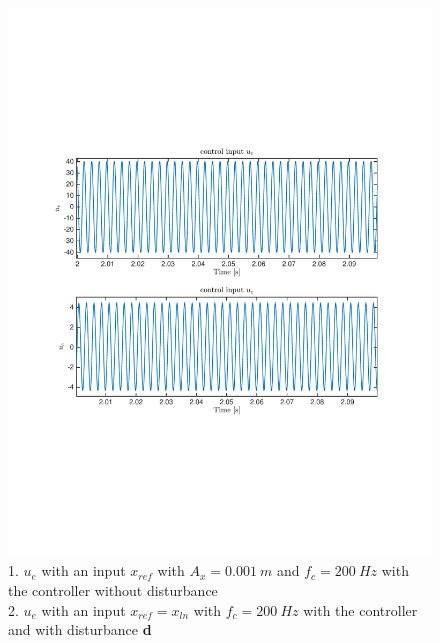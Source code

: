 \begin{figure}[H]
 \centering 
 \includegraphics[trim=2cm 7cm 2cm 7cm, clip=true, totalheight=0.35\textheight, angle=0]{figures/p16ue.pdf}
 \caption{1. $u_e$ with an input $x_{ref}$ with $A_x=0.001\ m$ and $f_c = 200\ Hz$ with the controller without disturbance\\
2. $u_e$ with an input $x_{ref} = x_{ln}$ with $f_c = 200\ Hz$ with the controller and with disturbance \textbf{d}}
 \label{fig:p16ue}
\end{figure}
